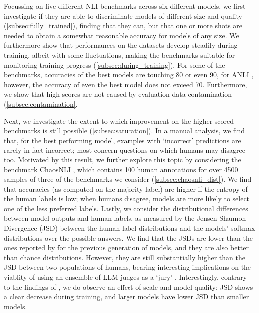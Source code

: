 Focussing on five different NLI benchmarks across six different models, we first investigate if they are able to discriminate models of different size and quality (\cref{subsec:fully_trained}), finding that they can, but that one or more shots are needed to obtain a somewhat reasonable accuracy for models of any size.
We furthermore show that performances on the datasets develop steadily during training, albeit with some fluctuations, making the benchmarks suitable for monitoring training progress (\cref{subsec:during_training}).
For some of the benchmarks, accuracies of the best models are touching 80 or even 90, for ANLI \citep{nie-etal-2020-adversarial}, however, the accuracy of even the best model does not exceed 70.
Furthermore, we show that high scores are not caused by evaluation data contamination (\cref{subsec:contamination}.

Next, we investigate the extent to which improvement on the higher-scored benchmarks is still possible (\cref{subsec:saturation}).
In a manual analysis, we find that, for the best performing model, examples with `incorrect' predictions are rarely in fact incorrect; most concern questions on which humans may disagree too.
Motivated by this result, we further explore this topic by considering the benchmark ChaosNLI \citep{nie-etal-2020-learn}, which contains 100 human annotations for over 4500 samples of three of the benchmarks we consider (\cref{subsec:chaosnli_dist}).
We find that accuracies (as computed on the majority label) are higher if the entropy of the human labels is low; when humans disagree, models are more likely to select one of the less preferred labels.
Lastly, we consider the distributional differences between model outputs and human labels, as measured by the Jensen Shannon Divergence (JSD) between the human label distributions and the models' softmax distributions over the possible answers.
We find that the JSDs are lower than the ones reported by \citet{nie-etal-2020-learn} for the previous generation of models, and they are also better than chance distributions. 
However, they are still substantially higher than the JSD between two populations of humans, bearing interesting implications on the viablity of using an ensemble of LLM judges as a `jury' \citep[e.g.][]{verga2024replacing}.
Interestingly, contrary to the findings of \citet{nie-etal-2020-learn}, we do observe an effect of scale and model quality: JSD shows a clear decrease during training, and larger models have lower JSD than smaller models.

